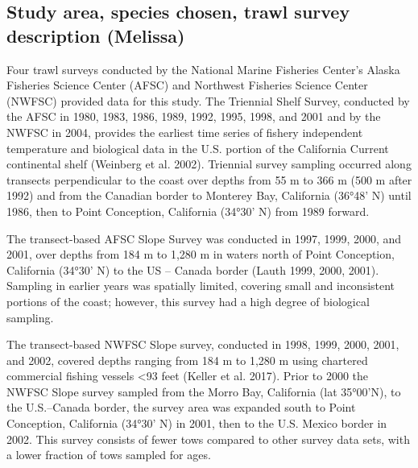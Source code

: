 \documentclass[
]{article}
\begin{document}
\hypertarget{study-area-species-chosen-trawl-survey-description-melissa}{%
\subsection{Study area, species chosen, trawl survey description
(Melissa)}\label{study-area-species-chosen-trawl-survey-description-melissa}}

Four trawl surveys conducted by the National Marine Fisheries Center's
Alaska Fisheries Science Center (AFSC) and Northwest Fisheries Science
Center (NWFSC) provided data for this study. The Triennial Shelf Survey,
conducted by the AFSC in 1980, 1983, 1986, 1989, 1992, 1995, 1998, and
2001 and by the NWFSC in 2004, provides the earliest time series of
fishery independent temperature and biological data in the U.S. portion
of the California Current continental shelf (Weinberg et al. 2002).
Triennial survey sampling occurred along transects perpendicular to the
coast over depths from 55 m to 366 m (500 m after 1992) and from the
Canadian border to Monterey Bay, California (36°48' N) until 1986, then
to Point Conception, California (34°30' N) from 1989 forward.

The transect-based AFSC Slope Survey was conducted in 1997, 1999, 2000,
and 2001, over depths from 184 m to 1,280 m in waters north of Point
Conception, California (34°30' N) to the US -- Canada border (Lauth
1999, 2000, 2001). Sampling in earlier years was spatially limited,
covering small and inconsistent portions of the coast; however, this
survey had a high degree of biological sampling.

The transect-based NWFSC Slope survey, conducted in 1998, 1999, 2000,
2001, and 2002, covered depths ranging from 184 m to 1,280 m using
chartered commercial fishing vessels \textless93 feet (Keller et al.
2017). Prior to 2000 the NWFSC Slope survey sampled from the Morro Bay,
California (lat 35°00'N), to the U.S.--Canada border, the survey area
was expanded south to Point Conception, California (34°30' N) in 2001,
then to the U.S. Mexico border in 2002. This survey consists of fewer
tows compared to other survey data sets, with a lower fraction of tows
sampled for ages.
\end{document}
